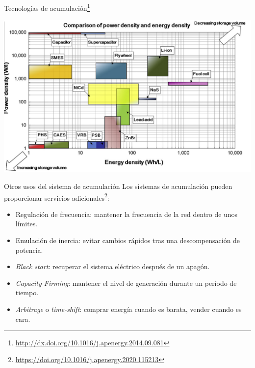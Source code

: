 \documentclass[aspectratio=169, usenames,svgnames,dvipsnames]{beamer}
\begin{document}
\begin{frame}[label={sec:org951d1d0}]{Tecnologías de acumulación\footnote{\url{http://dx.doi.org/10.1016/j.apenergy.2014.09.081}}}
\begin{center}
\includegraphics[height=0.8\textheight]{../figs/SistemasAcumulacion_DensidadPotenciaEnergia.png}
\end{center}
\end{frame}

\begin{frame}[label={sec:org381d150}]{Otros usos del sistema de acumulación}
Los sistemas de acumulación pueden proporcionar servicios adicionales\footnote{\url{https://doi.org/10.1016/j.apenergy.2020.115213}}:

\begin{itemize}
\item Regulación de frecuencia: mantener la frecuencia de la red dentro de unos límites.
\item Emulación de inercia: evitar cambios rápidos tras una descompensación de potencia.
\item \emph{Black start}: recuperar el sistema eléctrico después de un apagón.
\item \emph{Capacity Firming}: mantener el nivel de generación durante un período de tiempo.
\item \emph{Arbitrage} o \emph{time-shift}: comprar energía cuando es barata, vender cuando es cara.
\end{itemize}
\end{frame}
\end{document}
